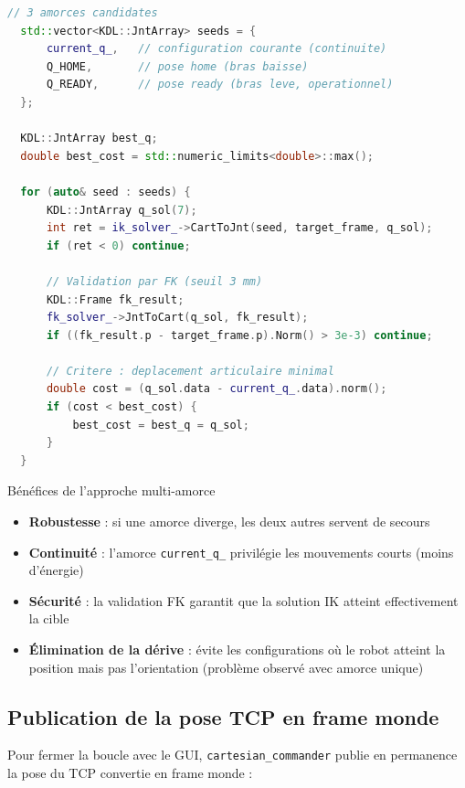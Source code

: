 \documentclass[11pt, a4paper]{article}
\begin{document}
\begin{lstlisting}[language=cpp, caption={Extrait cartesian\_commander.cpp — IK multi-amorce}]
  // 3 amorces candidates
  std::vector<KDL::JntArray> seeds = {
      current_q_,   // configuration courante (continuite)
      Q_HOME,       // pose home (bras baisse)
      Q_READY,      // pose ready (bras leve, operationnel)
  };

  KDL::JntArray best_q;
  double best_cost = std::numeric_limits<double>::max();

  for (auto& seed : seeds) {
      KDL::JntArray q_sol(7);
      int ret = ik_solver_->CartToJnt(seed, target_frame, q_sol);
      if (ret < 0) continue;

      // Validation par FK (seuil 3 mm)
      KDL::Frame fk_result;
      fk_solver_->JntToCart(q_sol, fk_result);
      if ((fk_result.p - target_frame.p).Norm() > 3e-3) continue;

      // Critere : deplacement articulaire minimal
      double cost = (q_sol.data - current_q_.data).norm();
      if (cost < best_cost) {
          best_cost = best_q = q_sol;
      }
  }
\end{lstlisting}

\begin{keybox}{Bénéfices de l'approche multi-amorce}
\begin{itemize}[leftmargin=1em, itemsep=2pt]
  \item \textbf{Robustesse} : si une amorce diverge, les deux autres servent de secours
  \item \textbf{Continuité} : l'amorce \texttt{current\_q\_} privilégie les mouvements courts (moins d'énergie)
  \item \textbf{Sécurité} : la validation FK garantit que la solution IK atteint effectivement la cible
  \item \textbf{Élimination de la dérive} : évite les configurations où le robot atteint la position mais pas l'orientation (problème observé avec amorce unique)
\end{itemize}
\end{keybox}

\subsection{Publication de la pose TCP en frame monde}

Pour fermer la boucle avec le GUI, \texttt{cartesian\_commander} publie en permanence la pose du TCP convertie en frame monde :
\end{document}

